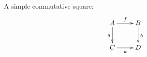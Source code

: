 \documentclass{article}
\begin{document}
A simple commutative square:
\[
\xymatrix{
  A \ar[r]^f \ar[d]_g & B \ar[d]^{h} \\
  C \ar[r]_k & D
}
\]
\end{document}
